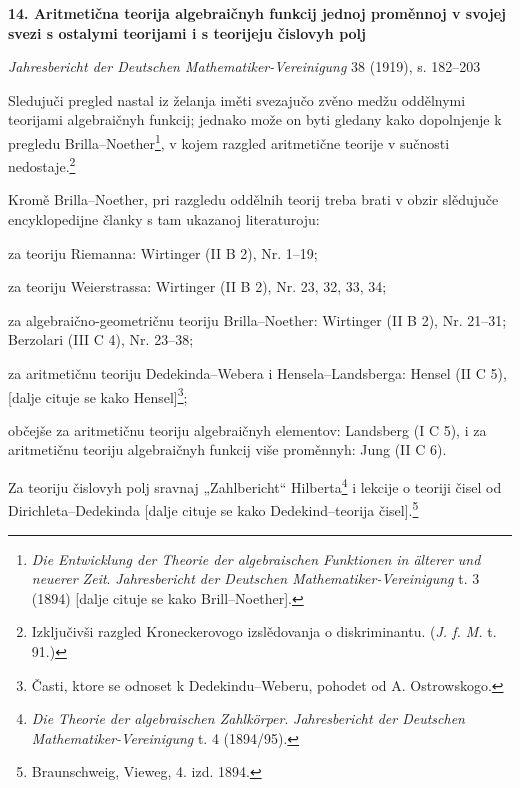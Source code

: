\documentclass[11pt]{article}
\begin{document}

\begin{center}
{\Large\bfseries 14. Aritmetična teorija algebraičnyh funkcij jednoj proměnnoj v svojej svezi s ostalymi teorijami i s teorijeju čislovyh polj\par}
\vspace{1.5em}
\emph{Jahresbericht der Deutschen Mathematiker-Vereinigung} 38 (1919), s. 182--203
\end{center}

Sledujuči pregled nastal iz želanja iměti svezajučo zvěno medžu oddělnymi teorijami algebraičnyh funkcij; jednako može on byti gledany kako dopolnjenje k pregledu Brilla--Noether\footnote{\emph{Die Entwicklung der Theorie der algebraischen Funktionen in älterer und neuerer Zeit}. \emph{Jahresbericht der Deutschen Mathematiker-Vereinigung} t. 3 (1894) [dalje cituje se kako Brill--Noether].}, v kojem razgled aritmetične teorije v sučnosti nedostaje.\footnote{Izključivši razgled Kroneckerovogo izslědovanja o diskriminantu. (\emph{J. f. M.} t. 91.)}

Kromě Brilla--Noether, pri razgledu oddělnih teorij treba brati v obzir slědujuče encyklopedijne članky s tam ukazanoj literaturoju:

za teoriju Riemanna: Wirtinger (II B 2), Nr. 1--19;

za teoriju Weierstrassa: Wirtinger (II B 2), Nr. 23, 32, 33, 34;

za algebraično-geometričnu teoriju Brilla--Noether: Wirtinger (II B 2), Nr. 21--31; Berzolari (III C 4), Nr. 23--38;

za aritmetičnu teoriju Dedekinda--Webera i Hensela--Landsberga: Hensel (II C 5), [dalje cituje se kako Hensel]\footnote{Časti, ktore se odnoset k Dedekindu--Weberu, pohodet od A. Ostrowskogo.};

občejše za aritmetičnu teoriju algebraičnyh elementov: Landsberg (I C 5), i za aritmetičnu teoriju algebraičnyh funkcij više proměnnyh: Jung (II C 6).

Za teoriju čislovyh polj sravnaj „Zahlbericht“ Hilberta\footnote{\emph{Die Theorie der algebraischen Zahlkörper}. \emph{Jahresbericht der Deutschen Mathematiker-Vereinigung} t. 4 (1894/95).} i lekcije o teoriji čisel od Dirichleta--Dedekinda [dalje cituje se kako Dedekind--teorija čisel].\footnote{Braunschweig, Vieweg, 4. izd. 1894.}
\end{document}

